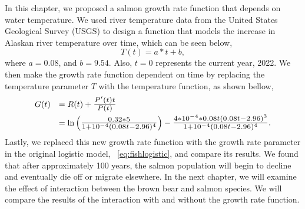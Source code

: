 In this chapter, we proposed a salmon growth rate function that depends on water temperature.
We used river temperature data from the United States Geological Survey (USGS) to design a function that models the increase in Alaskan river temperature over time, which can be seen below,
\begin{equation*}
    T(t) = a*t + b,
\end{equation*}
where $a=0.08$, and $b=9.54$.
Also, $t=0$ represents the current year, 2022.
We then make the growth rate function dependent on time by replacing the temperature parameter $T$ with the temperature function, as shown bellow,
\begin{equation*}
    \begin{array}{ll}
        G(t) &= R(t) + \scalebox{1.2}{$\frac{P'(t)t}{P(t)}$} \\[.2cm]
         &= \ln\left(\scalebox{1.2}{$\frac{0.32*5}{1+10^{-4}(0.08t-2.96)^4}$}\right) - \scalebox{1.2}{$\frac{4*10^{-4}*0.08t(0.08t-2.96)^3}{1+10^{-4}(0.08t-2.96)^4}$}.
    \end{array}
\end{equation*}
Lastly, we replaced this new growth rate function with the growth rate parameter in the original logistic model, \equationautorefname~\eqref{eq:fishlogistic}, and compare its results.
We found that after approximately 100 years, the salmon population will begin to decline and eventually die off or migrate elsewhere.
In the next chapter, we will examine the effect of interaction between the brown bear and salmon species.
We will compare the results of the interaction with and without the growth rate function.